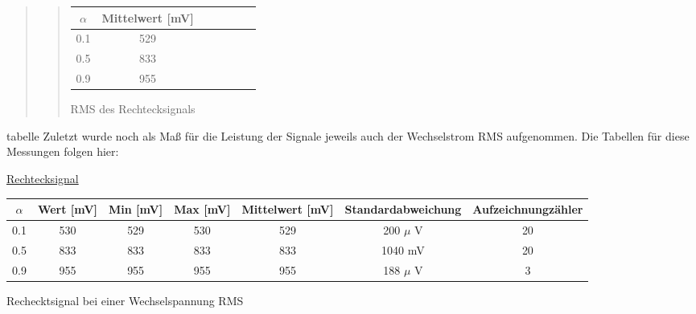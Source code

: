 \begin{quote}
\begin{quote}
            \hspace{-4em}
                  \begin{tabular}{|c|c|c|c|c|c|c|}
                  \hline
                   $\alpha $ &  Mittelwert [mV] \\ \hline 
                   0.1 &  529 \\ \hline
                   0.5 &  833 \\ \hline
                   0.9 &  955 \\ \hline           
                 \end{tabular}
                       \caption{RMS des Rechtecksignals}
                        \label{tablelabel1}
        
    \end{quote}


    
    


    
        
\end{quote}





tabelle
    Zuletzt wurde noch als Maß für die Leistung der Signale jeweils auch der
    Wechselstrom RMS aufgenommen. Die Tabellen für diese Messungen folgen hier:
    
    \underline{Rechtecksignal}
        
            \hspace{-4em}
                  \begin{tabular}{|c|c|c|c|c|c|c|}
                  \hline
                   $\alpha $ & Wert [mV] & Min [mV] & Max [mV] & Mittelwert
                   [mV] & Standardabweichung & Aufzeichnungzähler\\ \hline 
                   0.1 & 530 & 529 & 530 & 529 & 200 $\mu$ V & 20 \\ \hline
                   0.5 & 833 & 833 & 833 & 833 & 1040 mV & 20 \\ \hline
                   0.9 & 955 & 955 & 955 & 955 & 188 $\mu$ V & 3 \\ \hline           
                 \end{tabular}
                       \caption{Rechecktsignal bei einer Wechselspannung RMS}
                        \label{tablelabel1}
        
